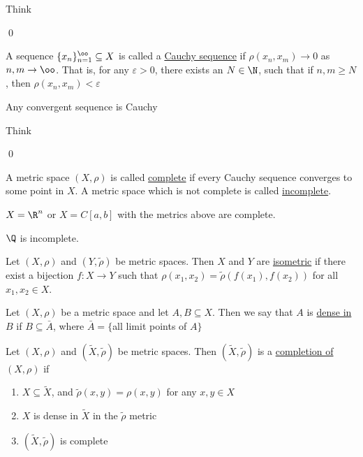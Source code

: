 \documentclass[x11names,reqno,14pt]{extarticle}
\newcommand{\seq}[2][\oo]{_{#2 = 1}^#1}
\begin{document}
Think

\qed


A sequence $\{x_n\}\seq{n}\subseteq X$ is called a \underline{Cauchy sequence} if $\rho(x_n, x_m)\to0$ as $n,m\to\oo$. That is, for any $\varepsilon>0$, there exists an $N \in \N$, such that if $n, m \geq N$, then $\rho(x_n, x_m) < \varepsilon$

\thm

Any convergent sequence is Cauchy

\proof

Think

\qed


A metric space $(X,\rho)$ is called \underline{complete} if every Cauchy sequence converges to some point in $X$. A metric space which is not complete is called \underline{incomplete}.

\exm 

$X = \R^n$ or $X = C[a,b]$ with the metrics above are complete. 

\exm

$\Q$ is incomplete. 


Let $(X, \rho)$ and $(Y, \tilde{\rho})$ be metric spaces. Then $X$ and $Y$ are \underline{isometric} if there exist a bijection $f:X\to Y$ such that $\rho(x_1, x_2) = \tilde{\rho}(f(x_1),f(x_2))$ for all $x_1, x_2 \in X$. 


Let $(X, \rho)$ be a metric space and let $A, B \subseteq X$. Then we say that $A$ is \underline{dense in $B$} if $B \subseteq \bar{A}$, where $\bar{A} = \{$all limit points of $A\}$


Let $(X, \rho)$ and $(\tilde{X},\tilde{\rho})$ be metric spaces. Then $(\tilde{X},\tilde{\rho})$ is a \underline{completion of $(X, \rho)$} if
\begin{enumerate}[label=(\roman*)]

\item $X \subseteq \tilde{X}$, and $\tilde{\rho}(x, y) = \rho(x, y)$ for any $x, y \in X$

\item $X$ is dense in $\tilde{X}$ in the $\tilde{\rho}$ metric

\item $(\tilde{X},\tilde{\rho})$ is complete

\end{enumerate}
\end{document}
